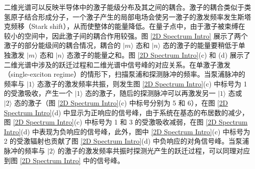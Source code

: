 \documentclass{thesis}
\begin{document}
二维光谱可以反映半导体中的激子能级分布及其之间的耦合。激子的耦合类似于类氢原子结合形成分子，一个激子产生的局部电场会使另一激子的激发频率发生斯塔克频移（Stark shift），从而使整体的能量降低。在量子点中，由于激子被束缚在较小的空间中，因此激子间的耦合作用较强。图 \ref{2D Spectrum Intro} 展示了两个激子的部分能级间的耦合情况，耦合的 $\lvert m\rangle$ 态和 $\lvert n\rangle$ 态的激子的能量要稍低于单独激发 $\lvert m\rangle$ 态和 $\lvert n\rangle$ 态激子的能量之和。图 \ref{2D Spectrum Intro}(c) 和 (d) 展示了二维光谱中涉及的跃迁过程和二维光谱中信号峰的对应关系。在单激子激发（single-exciton regime）的情形下，扫描泵浦和探测脉冲的频率。当泵浦脉冲的频率与 $\lvert 1\rangle$ 态激子的激发频率共振，则发生图 \ref{2D Spectrum Intro}(c) 中标号为 \textcircled{\footnotesize{1}} 的受激吸收，产生一个 $\lvert 1\rangle$ 态的激子，随后的探测脉冲可以再激发另一 $\lvert 1\rangle$ 态或 $\lvert 2\rangle$ 态的激子（图 \ref{2D Spectrum Intro}(c) 中标号分别为 \textcircled{\footnotesize{5}} 和 \textcircled{\footnotesize{6}}），在图 \ref{2D Spectrum Intro}(d) 中显示为正响应的信号峰，由于系统在基态的布居数的减少，图 \ref{2D Spectrum Intro}(c) 中标号为 \textcircled{\footnotesize{1}} 和 \textcircled{\footnotesize{3}} 的受激吸收减弱，在图 \ref{2D Spectrum Intro}(d) 中表现为负响应的信号峰，此外，图中 \ref{2D Spectrum Intro}(c) 中标号为 \textcircled{\footnotesize{2}} 的受激辐射也贡献了图 \ref{2D Spectrum Intro}(d) 中负响应的对角信号峰。当泵浦脉冲的频率与 $\lvert 2\rangle$ 的激子的激发频率共振时探测光产生的跃迁过程，可以同理对应到图 \ref{2D Spectrum Intro} 中的信号峰。
\end{document}
